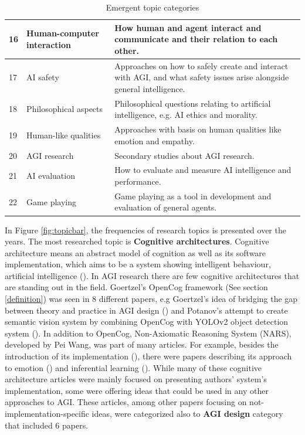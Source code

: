 \documentclass[utf8,english]{gradu3}
\begin{document}
\begin{table}[H]
\begin{tabular}{p{0.05\linewidth} p{0.30\linewidth} p{0.65\linewidth}}
    16 & Human-computer interaction & How human and agent interact and communicate and their relation to each other.\\ \hline
    17 & AI safety & Approaches on how to safely create and interact with AGI, and what safety issues arise alongside general intelligence.\\ \hline
    18 & Philosophical aspects & Philosophical questions relating to artificial intelligence, e.g. AI ethics and morality.\\ \hline
    19 & Human-like qualities & Approaches with basis on human qualities like emotion and empathy.\\ \hline
    20 & AGI research & Secondary studies about AGI research. \\ \hline
    21 & AI evaluation & How to evaluate and measure AI intelligence and performance.\\ \hline
    22 & Game playing  & Game playing as a tool in development and evaluation of general agents.\\ \hline

  \end{tabular}
  \caption{Emergent topic categories}
  \label{table:topicdescription}
\end{table}


In Figure \ref*{fig:topicbar}, the frequencies of research topics is presented
over the years. The most researched topic is \textbf{Cognitive architectures}.
Cognitive architecture means an abstract model of cognition as well as its
software implementation, which aims to be a system showing intelligent
behaviour, artificial intelligence (\cite{lieto2018}). In AGI research there are
few cognitive architectures that are standing out in the field. Goertzel's
OpenCog framework (See section \ref*{definition}) was seen in 8 different
papers, e.g Goertzel's idea of bridging the gap between theory and practice in
AGI design (\cite{goertzel2017agents}) and Potanov's attempt to create semantic
vision system by combining OpenCog with YOLOv2 object detection system
(\cite{potapov2018}). In addition to OpenCog, Non-Axiomatic Reasoning System
(NARS), developed by Pei Wang, was part of many articles. For example, besides
the introduction of its implementation (\cite{hammer2016opennars}), there were
papers describing its approach to emotion (\cite{wang2016emotional}) and
inferential learning (\cite{wang2016learning}). While many of these cognitive
architecture articles were mainly focused on presenting authors' system's
implementation, some were offering ideas that could be used in any other
approaches to AGI. These articles, among other papers focusing on
not-implementation-specific ideas, were categorized also to \textbf{AGI design}
category that included 6 papers.
\end{document}
